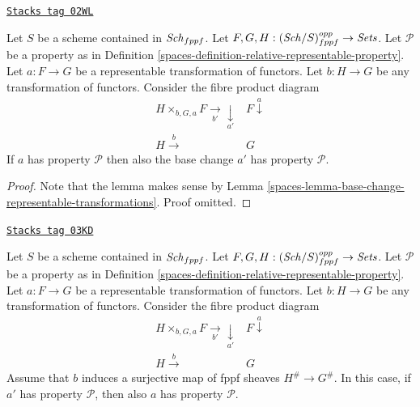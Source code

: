 \begin{lemma}
\label{spaces-lemma-base-change-representable-transformations-property}
\href{https://stacks.math.columbia.edu/tag/02WL}{\texttt{Stacks tag 02WL}}

Let $S$ be a scheme contained in $\mathit{Sch}_{fppf}$.
Let $F, G, H : (\mathit{Sch}/S)_{fppf}^{opp} \to \textit{Sets}$.
Let $\mathcal{P}$ be a property as in
Definition \ref{spaces-definition-relative-representable-property}.
Let $a : F \to G$ be a representable transformation of functors.
Let $b : H \to G$ be any transformation of functors.
Consider the fibre product diagram
$$
\begin{array}{cc}H \times_{b, G, a} F \underset{b'}{\longrightarrow}\underset{a'}{\downarrow} & F \overset{a}{\downarrow} \\ H \overset{b}{\longrightarrow} & G\end{array}
$$
If $a$ has property $\mathcal{P}$ then also the base change $a'$
has property $\mathcal{P}$.
\end{lemma}

\begin{proof}

Note that the lemma makes sense by
Lemma \ref{spaces-lemma-base-change-representable-transformations}.
Proof omitted.
\end{proof}

\begin{lemma}
\label{spaces-lemma-descent-representable-transformations-property}
\href{https://stacks.math.columbia.edu/tag/03KD}{\texttt{Stacks tag 03KD}}

Let $S$ be a scheme contained in $\mathit{Sch}_{fppf}$.
Let $F, G, H : (\mathit{Sch}/S)_{fppf}^{opp} \to \textit{Sets}$.
Let $\mathcal{P}$ be a property as in
Definition \ref{spaces-definition-relative-representable-property}.
Let $a : F \to G$ be a representable transformation of functors.
Let $b : H \to G$ be any transformation of functors.
Consider the fibre product diagram
$$
\begin{array}{cc}H \times_{b, G, a} F \underset{b'}{\longrightarrow}\underset{a'}{\downarrow} & F \overset{a}{\downarrow} \\ H \overset{b}{\longrightarrow} & G\end{array}
$$
Assume that $b$ induces a surjective map of fppf sheaves $H^\# \to G^\#$.
In this case, if $a'$ has property $\mathcal{P}$, then also $a$
has property $\mathcal{P}$.
\end{lemma}

